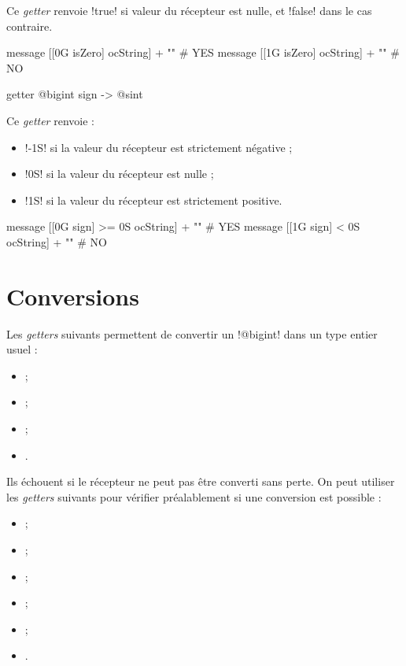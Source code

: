 Ce \emph{getter} renvoie \ggs!true! si valeur du récepteur est nulle, et \ggs!false! dans le cas contraire.

\begin{galgas}
message [[0G isZero] ocString] + "\n" # YES
message [[1G isZero] ocString] + "\n" # NO
\end{galgas}




\begin{galgasbox}
getter @bigint sign -> @sint
\end{galgasbox}

Ce \emph{getter} renvoie :
\begin{itemize}
\item \ggs!-1S! si la valeur du récepteur est strictement négative ;
\item \ggs!0S! si la valeur du récepteur est nulle ;
\item \ggs!1S! si la valeur du récepteur est strictement positive.
\end{itemize}

\begin{galgas}
message [[0G sign] >= 0S ocString] + "\n" # YES
message [[1G sign] < 0S ocString] + "\n" # NO
\end{galgas}











\section{Conversions}


Les \emph{getters} suivants permettent de convertir un \ggs!@bigint! dans un type entier usuel :
\begin{itemize}
  \item {} ;
  \item {} ;
  \item {} ;
  \item {}.
\end{itemize}

Ils échouent si le récepteur ne peut pas être converti sans perte. On peut utiliser les \emph{getters} suivants pour vérifier préalablement si une conversion est possible :
\begin{itemize}
  \item {} ;
  \item {} ;
  \item {} ;
  \item {} ;
  \item {} ;
  \item {}.
\end{itemize}

